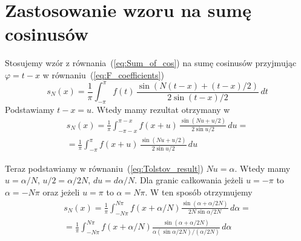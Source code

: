 \section{Zastosowanie wzoru na sumę cosinusów}



Stosujemy wzór z równania~(\ref{eq:Sum_of_cos}) na sumę cosinusów przyjmując $\varphi=t-x$
w równaniu~(\ref{eq:F_coefficients})
\begin{equation}
s_{N}(x) = \frac{1}{\pi} \int_{-\pi}^{\pi} f(t) \, \frac{\sin(N(t-x)+(t-x)/2)}{2 \sin (t-x)/2} \, dt
\end{equation}
Podstawiamy $t-x = u$\@. Wtedy mamy rezultat otrzymany w~\cite{kn:Tolstov_Book}
\begin{eqnarray}
\label{eq:Tolstov_result}
s_{N}(x) = \frac{1}{\pi} \int_{-\pi-x}^{\pi-x} f(x+u) \, \frac{\sin(Nu+u/2)}{2 \sin u/2} \, du  =   \\ \nonumber
=
\frac{1}{\pi} \int_{-\pi}^{\pi} f(x+u) \, \frac{\sin(Nu+u/2)}{2 \sin u/2} \, du
\end{eqnarray}


Teraz podstawiamy w równaniu~(\ref{eq:Tolstov_result})
$Nu=\alpha$\@. Wtedy mamy $u=\alpha/N$, $u/2=\alpha/2N$, $du=d\alpha/N$\@.
Dla granic całkowania
jeżeli $u=-\pi$ to $\alpha=-N\pi$ oraz jeżeli $u=\pi$ to $\alpha=N\pi$\@.
W ten sposób otrzymujemy
\begin{eqnarray}
s_{N}(x) = \frac{1}{\pi} \int_{-N\pi}^{N\pi} f(x+\alpha/N) \frac{\sin(\alpha+\alpha/2N)}{2N \sin \alpha/2N} \, d\alpha  =    \\ \nonumber
= \frac{1}{\pi} \int_{-N\pi}^{N\pi} f(x+\alpha/N) \frac{\sin(\alpha+\alpha/2N)}{\alpha (\sin \alpha/2N)/(\alpha/2N)} \, d\alpha
\end{eqnarray}




